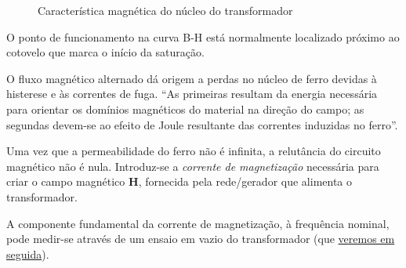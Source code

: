 \begin{minipage}[b]{0.275\linewidth}
   \begin{figure}[H]
        \centering
        \caption{Característica magnética do núcleo do transformador}
        \label{fig:hysteresis-iron}
    \end{figure} 
\end{minipage}\hfill
\begin{minipage}[b]{0.65\linewidth}
    O ponto de funcionamento na curva B-H está normalmente localizado próximo ao cotovelo que marca o início da saturação.

    \hspace{1em} O fluxo magnético alternado dá origem a perdas no núcleo de ferro devidas à histerese e às correntes de fuga. ``As primeiras resultam da energia necessária para orientar os domínios magnéticos do material na direção do campo; as segundas devem-se ao efeito de Joule resultante das correntes induzidas no ferro''\cite{paiva2005}.

    \hspace{1em} Uma vez que a permeabilidade do ferro não é infinita, a relutância do circuito magnético não é nula. Introduz-se a \textit{corrente de magnetização} necessária para criar o campo magnético $\mathbf{H}$, fornecida pela rede/gerador que alimenta o transformador.
\end{minipage}

\vspace{0.75em}
\noindent A componente fundamental da corrente de magnetização, à frequência nominal, pode medir-se através de um ensaio em vazio do transformador (que \hyperref[subsec:analise-transformador]{veremos em seguida}).

